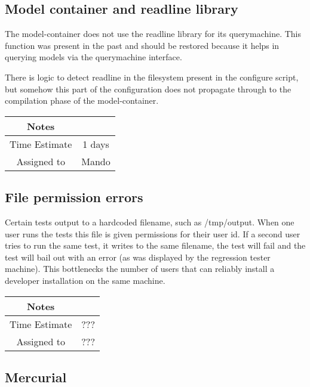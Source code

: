 \documentclass[12pt]{article}
\begin{document}
\subsection{Model container and readline library}

The model-container does not use the readline library for its
querymachine.  This function was present in the past and should be
restored because it helps in querying models via the querymachine
interface.

There is logic to detect readline in the filesystem present in the
configure script, but somehow this part of the configuration does not
propagate through to the compilation phase of the model-container.

{
  \vspace{5mm}
  \centering
  \begin{tabular}{|c|c|}
    \hline
    Notes
    & \\
    \hline
    Time Estimate
    & 1 days \\
    \hline
    Assigned to
    & Mando \\
    \hline
  \end{tabular}
}


\subsection{File permission errors}

Certain tests output to a hardcoded filename, such as /tmp/output.
When one user runs the tests this file is given permissions for their
user id. If a second user tries to run the same test, it writes to the
same filename, the test will fail and the test will bail out with an
error (as was displayed by the regression tester machine).  This
bottlenecks the number of users that can reliably install a developer
installation on the same machine.


{
  \vspace{5mm}
  \centering
  \begin{tabular}{|c|c|}
    \hline
    Notes
    &  \\
    \hline
    Time Estimate
    & ??? \\
    \hline
    Assigned to
    & ??? \\
    \hline
  \end{tabular}
}


\subsection{Mercurial}
\end{document}
